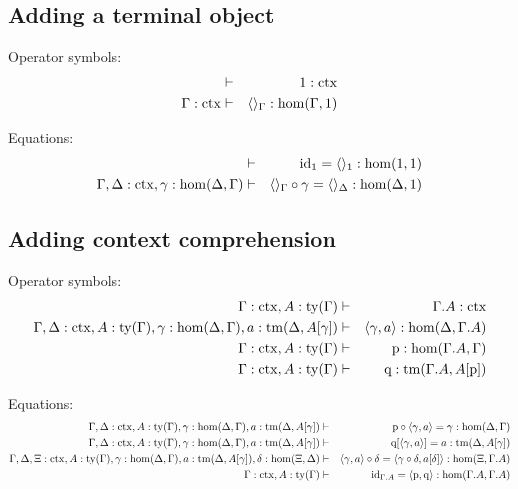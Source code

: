 \documentclass{lmcs}
\def\Hom{\mathrm{hom}}
\def\id{\mathrm{id}}
\newcommand{\ctx}{\mathrm{ctx}}
\newcommand{\ty}{\mathrm{ty}}
\newcommand{\tm}{\mathrm{tm}}
\def\p{\mathrm{p}}
\def\q{\mathrm{q}}
\begin{document}
\subsection{Adding a terminal object}
\hspace{1em}

Operator symbols:
\begin{eqnarray*}
&\vdash& 1 : \ctx\\
\Gamma : \ctx &\vdash& \tuple{}_\Gamma : \Hom(\Gamma,1)
\end{eqnarray*}

Equations:
\begin{eqnarray*}
 &\vdash& \id_1 = \tuple{}_1 : \Hom(1,1)\\
\Gamma,\Delta : \ctx, \gamma : \Hom(\Delta,\Gamma) &\vdash&
\tuple{}_\Gamma\circ\gamma = \tuple{}_\Delta : \Hom(\Delta,1)
\end{eqnarray*}


\subsection{Adding context comprehension}
\hspace{1em}

Operator symbols:
\begin{eqnarray*}
\Gamma : \ctx, A:\ty(\Gamma) &\vdash& \Gamma\cext A : \ctx\\
\Gamma,\Delta : \ctx, A:\ty(\Gamma), \gamma : \Hom(\Delta,\Gamma), a:\tm(\Delta,A[\gamma]) &\vdash& \tuple{\gamma,a} : \Hom(\Delta,\Gamma\cext A)\\
\Gamma : \ctx, A:\ty(\Gamma) &\vdash& \p: \Hom(\Gamma\cext A,\Gamma)\\
\Gamma : \ctx, A:\ty(\Gamma) &\vdash& \q: \tm(\Gamma\cext A,A[\p])
\end{eqnarray*}

Equations:
\begin{eqnarray*}
\Gamma,\Delta : \ctx, A:\ty(\Gamma), \gamma : \Hom(\Delta,\Gamma), a:\tm(\Delta,A[\gamma]) &\vdash& \p\circ\tuple{\gamma,a} = \gamma : \Hom(\Delta,\Gamma)\\
\Gamma,\Delta : \ctx, A:\ty(\Gamma), \gamma : \Hom(\Delta,\Gamma), a:\tm(\Delta,A[\gamma]) &\vdash& \q[\tuple{\gamma,a}] = a : \tm(\Delta,A[\gamma]) \\
\Gamma,\Delta,\Xi : \ctx, A:\ty(\Gamma), \gamma : \Hom(\Delta,\Gamma), a:\tm(\Delta,A[\gamma]), \delta : \Hom(\Xi,\Delta) &\vdash&
\tuple{\gamma,a} \circ \delta = \tuple{\gamma\circ\delta,a[\delta]} :
\Hom(\Xi,\Gamma\cext A) \\
\Gamma : \ctx, A:\ty(\Gamma) &\vdash&
\id_{\Gamma\cext A} = \tuple{\p,\q} : \Hom(\Gamma\cext A,\Gamma\cext A)
\end{eqnarray*}
\end{document}
